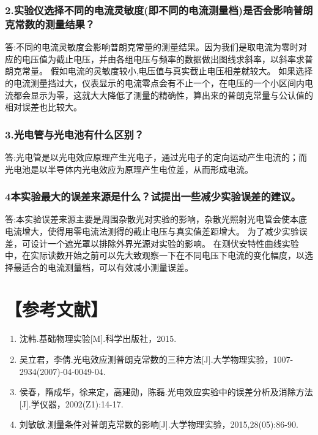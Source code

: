 \documentclass[12pt,a4paper,UTF8]{ctexart}
\begin{document}
\subsubsection*{2.实验仪选择不同的电流灵敏度(即不同的电流测量档)是否会影响普朗克常数的测量结果？}
答:不同的电流灵敏度会影响普朗克常量的测量结果。因为我们是取电流为零时对应的电压值为截止电压，并由各组电压与频率的数据做出图线求斜率，以斜率求普朗克常量。
假如电流的灵敏度较小,电压值与真实截止电压相差就较大。
如果选择的电流测量挡过大，仪表显示的电流零点会有不止一个，在电压的一个小区间内电流都会显示为零，这就大大降低了测量的精确性，算出来的普朗克常量与公认值的相对误差也比较大。
\subsubsection*{3.光电管与光电池有什么区别？}
答:光电管是以光电效应原理产生光电子，通过光电子的定向运动产生电流的；而光电池是以半导体内光电效应为原理产生电位差，从而形成电流。
\subsubsection*{4本实验最大的误差来源是什么？试提出一些减少实验误差的建议。}
答:本实验误差来源主要是周围杂散光对实验的影响，杂散光照射光电管会使本底电流增大，使得用零电流法测得的截止电压与真实值差距增大。
为了减少实验误差，可设计一个遮光罩以排除外界光源对实验的影响。
在测伏安特性曲线实验中，在实际读数开始之前可以先大致观察一下在不同电压下电流的变化幅度，以选择最适合的电流测量档，可以有效减小测量误差。


\section*{【参考文献】}
\begin{enumerate}
	\item 沈韩.基础物理实验[M].科学出版社，2015.
	\item 吴立君，李倩.光电效应测普朗克常数的三种方法[J].大学物理实验，1007-2934(2007)-04-0049-04.
	\item 侯春，隋成华，徐来定，高建勋，陈磊.光电效应实验中的误差分析及消除方法[J].学仪器，2002(Z1):14-17.
	\item 刘敏敏.测量条件对普朗克常数的影响[J].大学物理实验，2015,28(05):86-90.
\end{enumerate}
\end{document}
